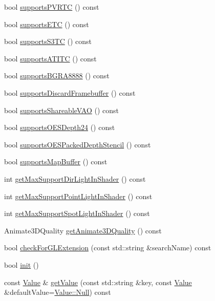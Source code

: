 \begin{DoxyCompactItemize}
bool \hyperlink{classConfiguration_a58248f2265a92b786058241241cbef1d}{supports\+P\+V\+R\+TC} () const
\item 
bool \hyperlink{classConfiguration_aeb2edb07e4e99adcc5cac8eb40dd5bd1}{supports\+E\+TC} () const
\item 
bool \hyperlink{classConfiguration_af641ae5267113baf708ece702a209b3c}{supports\+S3\+TC} () const
\item 
bool \hyperlink{classConfiguration_a2db018db47cee9e1794138cd8ebf1c40}{supports\+A\+T\+I\+TC} () const
\item 
bool \hyperlink{classConfiguration_a7a86b970a922722012ad50be92e1046f}{supports\+B\+G\+R\+A8888} () const
\item 
bool \hyperlink{classConfiguration_aefcc23eeb53ca5d1fa1115f370c46fe9}{supports\+Discard\+Framebuffer} () const
\item 
bool \hyperlink{classConfiguration_acbd9837dcbd01d0e4994dd361b3e7671}{supports\+Shareable\+V\+AO} () const
\item 
bool \hyperlink{classConfiguration_a4a522f90b542f8aae0cfcfbfbb9c6ee5}{supports\+O\+E\+S\+Depth24} () const
\item 
bool \hyperlink{classConfiguration_a8198d85a51e8b33a9171b0087112038d}{supports\+O\+E\+S\+Packed\+Depth\+Stencil} () const
\item 
bool \hyperlink{classConfiguration_a765fca7763cf48f4ebc8947e2800aa10}{supports\+Map\+Buffer} () const
\item 
int \hyperlink{classConfiguration_a4ab4373afd4bca790279ef1c907b17cb}{get\+Max\+Support\+Dir\+Light\+In\+Shader} () const
\item 
int \hyperlink{classConfiguration_ab26f93b21e2d51d7b343068b15252f1b}{get\+Max\+Support\+Point\+Light\+In\+Shader} () const
\item 
int \hyperlink{classConfiguration_a103e36372191a3a0046728d3e8476601}{get\+Max\+Support\+Spot\+Light\+In\+Shader} () const
\item 
Animate3\+D\+Quality \hyperlink{classConfiguration_aa7340d160089d9f6de0ebc916740c3c1}{get\+Animate3\+D\+Quality} () const
\item 
bool \hyperlink{classConfiguration_a09fd5d87edb45d08c701e048d5ff30f9}{check\+For\+G\+L\+Extension} (const std\+::string \&search\+Name) const
\item 
bool \hyperlink{classConfiguration_a4eac7383dc99601820516eef2d1dce85}{init} ()
\item 
const \hyperlink{classValue}{Value} \& \hyperlink{classConfiguration_ae7193e84dd5e20ca52660784615771be}{get\+Value} (const std\+::string \&key, const \hyperlink{classValue}{Value} \&default\+Value=\hyperlink{classValue_af01b27b1c6ca5f4577a4b6c10a186f59}{Value\+::\+Null}) const

\end{DoxyCompactItemize}
